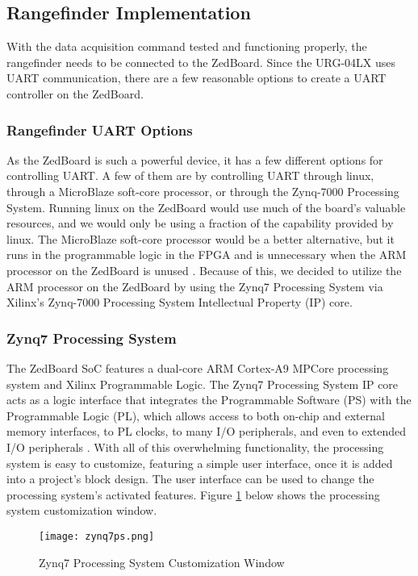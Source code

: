 \subsection{Rangefinder Implementation}
With the data acquisition command tested and functioning properly, the rangefinder needs to be connected to the ZedBoard. Since the URG-04LX uses UART communication, there are a few reasonable options to create a UART controller on the ZedBoard.

\subsubsection{Rangefinder UART Options}
As the ZedBoard is such a powerful device, it has a few different options for controlling UART. A few of them are by controlling UART through linux, through a MicroBlaze soft-core processor, or through the Zynq-7000 Processing System. Running linux on the ZedBoard would use much of the board's valuable resources, and we would only be using a fraction of the capability provided by linux. The MicroBlaze soft-core processor would be a better alternative, but it runs in the programmable logic in the FPGA and is unnecessary when the ARM processor on the ZedBoard is unused \cite{microblaze}. Because of this, we decided to utilize the ARM processor on the ZedBoard by using the Zynq7 Processing System via Xilinx's Zynq-7000 Processing System Intellectual Property (IP) core.

\subsubsection{Zynq7 Processing System}
The ZedBoard SoC features a dual-core ARM Cortex-A9 MPCore processing system and Xilinx Programmable Logic. The Zynq7 Processing System IP core acts as a logic interface that integrates the Programmable Software (PS) with the Programmable Logic (PL), which allows access to both on-chip and external memory interfaces, to PL clocks, to many I/O peripherals, and even to extended I/O peripherals \cite{zynq7ps}. With all of this overwhelming functionality, the processing system is easy to customize, featuring a simple user interface, once it is added into a project's block design. The user interface can be used to change the processing system's activated features. Figure \ref{zynq7ps_pic} below shows the processing system customization window.

\begin{figure}[H]
	\centerline{\texttt{[image: zynq7ps.png]}}
	\caption{Zynq7 Processing System Customization Window \cite{zynq7ps}}
	\label{zynq7ps_pic}
\end{figure}

